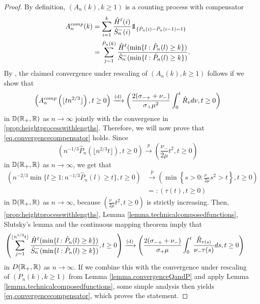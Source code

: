 \begin{proof}
By definition, $(A_n(k),k\geq 1)$ is a counting process with compensator 
\begin{align*}
    A_n^{comp}(k)&=\sum_{i=1}^k \frac{\hat{H}^\ell(i)}{\hat{S}^-_n(i)}\one_{\{\hat{P}_n(i)-\hat{P}_n(i-1)=1\}}\\
    &=\sum_{j=1}^{\hat{P}_n(k)}\frac{\hat{H}^\ell(\min\{l:\hat{P}_n(l)\geq k\})}{\hat{S}^-_n(\min\{l:\hat{P}_n(l)\geq k\})}.
\end{align*}
 By \citet[Theorem 14.2.VIII]{daleyIntroductionTheoryPoint2008}, the claimed convergence under rescaling of $(A_n(k),k\geq 1)$ follows if we show that 
\begin{equation}\label{eq.convergencecompensator}
    \left(A_n^{comp}\left(\lfloor tn^{2/3}\rfloor \right), t\geq 0\right)\xrightarrow[]{\mathrm{(d)}}\left(\frac{2(\sigma_{-+}+\nu_-)}{\sigma_+\mu^2} \int_0^t\hat{R}_v dv, t \geq 0\right)
\end{equation}
in ${\mathbb D}({\mathbb R}_+,{\mathbb R})$ as $n\to \infty$ jointly with the convergence in \cref{prop:heightprocesswithlengths}. Therefore, we will now prove that \eqref{eq.convergencecompensator} holds. Since
$$\left(n^{-1/3}\hat{P}_n\left(\lfloor n^{2/3}t\rfloor \right),t\geq 0\right)\overset{p}{\to}\left(\frac{\nu_-}{2\mu}t^2,t\geq 0\right)$$
in ${\mathbb D}({\mathbb R}_+,{\mathbb R})$ as $n\to \infty$,
we get that
\begin{align*}\left(n^{-2/3}\min\{l\geq 1:n^{-1/3}\hat{P}_n(l)\geq t\},t\geq 0\right)&\overset{p}{\to}\left(\min\left\{s>0: \frac{\nu_-}{2\mu}s^2>t\right \}, t\geq 0\right)\\
&=:\left(\tau(t),t\geq 0\right) \end{align*}
in ${\mathbb D}({\mathbb R}_+,{\mathbb R})$ as $n\to \infty$, because $\left(\frac{\nu_-}{2\mu}t^2,t\geq 0\right)$ is strictly increasing. Then, \cref{prop:heightprocesswithlengths}, Lemma \ref{lemma.technicalcomposedfunctions}, Slutsky's lemma and the continuous mapping theorem imply that 
\begin{align*}&\left(\sum_{j=1}^{\lfloor n^{1/3}t\rfloor}\frac{\hat{H}^\ell(\min\{l:\hat{P}_n(l)\geq k\})}{\hat{S}^-_n(\min\{l:\hat{P}_n(l)\geq k\})},t\geq 0\right)\xrightarrow[]{\mathrm{(d)}} \left( \frac{2(\sigma_{-+}+\nu_-)}{\sigma_+\mu} \int_0^t \frac{\hat{R}_{\tau(s)}}{\nu_- \tau(s)}ds,t\geq 0 \right)
\end{align*}
in $D({\mathbb R}_+,{\mathbb R})$ as $n\to\infty$. If we combine this with the convergence under rescaling of $(P_n(k),k\geq 1)$ from Lemma \ref{lemma.convergenceQandP} and apply Lemma \ref{lemma.technicalcomposedfunctions}, some simple analysis then yields \eqref{eq.convergencecompensator}, which proves the statement.
\end{proof}

